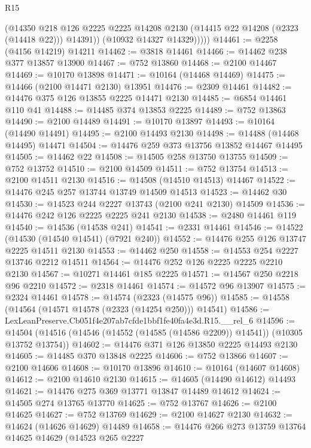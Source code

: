 \begin{lexlean}{R15}
\begin{coremodule}
              (@14350
                @218
                @126
                @2225
                @2225
                @14208
                @2130
                (@14415 @22 @14208 (@2323 (@14418 @22)))
                @14391))
            (@10932 @14327 @14329)))))
@14461 := @2258 (@4156 @14219) @14211
@14462 := @3818 @14461
@14466 := @14462 @238 @377 @13857 @13900
@14467 := @752 @13860
@14468 := @2100 @14467
@14469 := @10170 @13898
@14471 := @10164 (@14468 @14469)
@14475 := @14466 (@2100 @14471 @2130) @13951
@14476 := @2309 @14461
@14482 := @14476 @375 @126 @13855 @2225 @14471 @2130
@14485 := @6854 @14461 @110 @41
@14488 := @14485 @374 @13853 @2225
@14489 := @752 @13863
@14490 := @2100 @14489
@14491 := @10170 @13897
@14493 := @10164 (@14490 @14491)
@14495 := @2100 @14493 @2130
@14498 := @14488 (@14468 @14495) @14471
@14504 := @14476 @259 @373 @13756 @13852 @14467 @14495
@14505 := @14462 @22
@14508 := @14505 @258 @13750 @13755
@14509 := @752 @13752
@14510 := @2100 @14509
@14511 := @752 @13754
@14513 := @2100 @14511 @2130
@14516 := @14508 (@14510 @14513) @14467
@14522 := @14476 @245 @257 @13744 @13749 @14509 @14513
@14523 := @14462 @30
@14530 := @14523 @244 @2227 @13743 (@2100 @241 @2130) @14509
@14536 := @14476 @242 @126 @2225 @2225 @241 @2130
@14538 := @2480 @14461 @119
@14540 := @14536 (@14538 @241)
@14541 := @2331 @14461
@14546 := @14522 (@14530 (@14540 @14541) (@7921 @240))
@14552 := @14476 @255 @126 @13747 @2225 @14511 @2130
@14553 := @14462 @250
@14558 := @14553 @254 @2227 @13746 @2212 @14511
@14564 := @14476 @252 @126 @2225 @2225 @2210 @2130
@14567 := @10271 @14461 @185 @2225
@14571 := @14567 @250 @2218 @96 @2210
@14572 := @2318 @14461
@14574 := @14572 @96 @13907
@14575 := @2324 @14461
@14578 := @14574 (@2323 (@14575 @96))
@14585 := @14558 (@14564 (@14571 @14578 (@2323 (@14254 @250))) @14541)
@14586 := LexLeanPreserve.Cb051f4e207ab7cfde1bbf1fe40fa4e3d.R15.__rel_6
@14596 := @14504 (@14516 (@14546 (@14552 (@14585 (@14586 @2209)) @14541)) (@10305 @13752 @13754))
@14602 := @14476 @371 @126 @13850 @2225 @14493 @2130
@14605 := @14485 @370 @13848 @2225
@14606 := @752 @13866
@14607 := @2100 @14606
@14608 := @10170 @13896
@14610 := @10164 (@14607 @14608)
@14612 := @2100 @14610 @2130
@14615 := @14605 (@14490 @14612) @14493
@14621 := @14476 @275 @369 @13771 @13847 @14489 @14612
@14624 := @14505 @274 @13765 @13770
@14625 := @752 @13767
@14626 := @2100 @14625
@14627 := @752 @13769
@14629 := @2100 @14627 @2130
@14632 := @14624 (@14626 @14629) @14489
@14658 := @14476
    @266
    @273
    @13759
    @13764
    @14625
    @14629
    (@14523
      @265
      @2227

\end{coremodule}
\end{lexlean}
